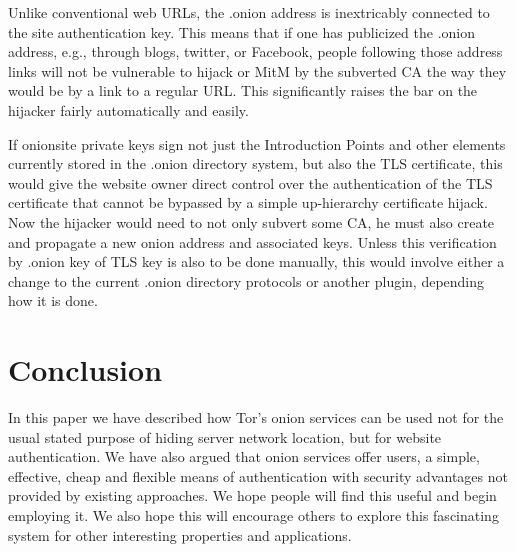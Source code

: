 \documentclass[10pt, conference, compsocconf]{styles/IEEEtran}
\newcommand{\point}[1]{\noindent\textbf{#1}.}
\begin{document}
Unlike conventional web URLs, the .onion address is inextricably connected to
the site authentication key. This means that if one has publicized the
.onion address, e.g., through blogs, twitter, or Facebook, people
following those address links will not be vulnerable to hijack or MitM
by the subverted CA the way they would be by a link to a regular
URL\@. This significantly raises the bar on the hijacker fairly
automatically and easily.

If onionsite private keys sign not just the Introduction Points and
other elements currently stored in the .onion directory system, but
also the TLS certificate, this would give the website owner direct
control over the authentication of the TLS certificate that cannot be
bypassed by a simple up-hierarchy certificate hijack. Now the hijacker
would need to not only subvert some CA, he must also create and
propagate a new onion address and associated keys. Unless this
verification by .onion key of TLS key is also to be done manually,
this would involve either a change to the current .onion directory
protocols or another plugin, depending how it is done.

\section{Conclusion}

In this paper we have described how Tor's onion services can be used
not for the usual stated purpose of hiding server network location,
but for website authentication.  We have also argued that onion
services offer users, a simple, effective, cheap and flexible means of
authentication with security advantages not provided by existing
approaches. We hope people will find this useful and begin employing
it. We also hope this will encourage others to explore this
fascinating system for other interesting properties and applications.




 
\newcommand{\BIBdecl}{\setlength{\itemsep}{0\baselineskip plus 0.1\baselineskip minus 0.1\baselineskip}}
\balance
{\footnotesize 


}

 
%
\end{document}
